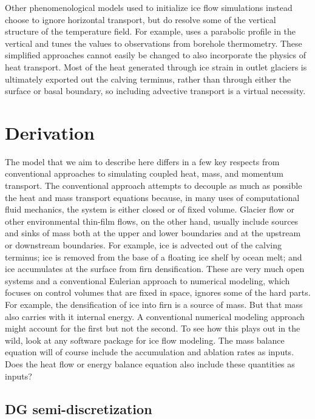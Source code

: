 \documentclass{article}
\theoremstyle{definition}
\theoremstyle{plain}
\begin{document}
Other phenomenological models used to initialize ice flow simulations instead choose to ignore horizontal transport, but do resolve some of the vertical structure of the temperature field.
For example, \citet{humbert2005parameter} uses a parabolic profile in the vertical and tunes the values to observations from borehole thermometry.
These simplified approaches cannot easily be changed to also incorporate the physics of heat transport.
Most of the heat generated through ice strain in outlet glaciers is ultimately exported out the calving terminus, rather than through either the surface or basal boundary, so including advective transport is a virtual necessity.


\section{Derivation}

The model that we aim to describe here differs in a few key respects from conventional approaches to simulating coupled heat, mass, and momentum transport.
The conventional approach attempts to decouple as much as possible the heat and mass transport equations because, in many uses of computational fluid mechanics, the system is either closed or of fixed volume.
Glacier flow or other environmental thin-film flows, on the other hand, usually include sources and sinks of mass both at the upper and lower boundaries and at the upstream or downstream boundaries.
For example, ice is advected out of the calving terminus; ice is removed from the base of a floating ice shelf by ocean melt; and ice accumulates at the surface from firn densification.
These are very much open systems and a conventional Eulerian approach to numerical modeling, which focuses on control volumes that are fixed in space, ignores some of the hard parts.
For example, the densification of ice into firn is a source of mass.
But that mass also carries with it internal energy.
A conventional numerical modeling approach might account for the first but not the second.
To see how this plays out in the wild, look at any software package for ice flow modeling.
The mass balance equation will of course include the accumulation and ablation rates as inputs.
Does the heat flow or energy balance equation also include these quantities as inputs?

\subsection{DG semi-discretization}
\end{document}
